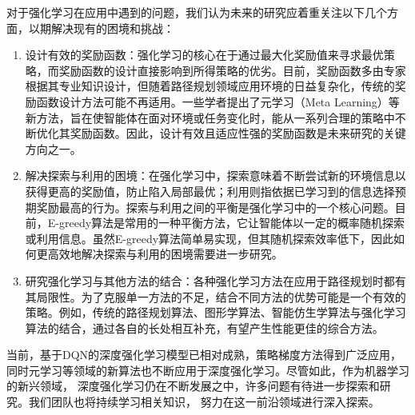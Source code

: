\documentclass{thuemp}
\begin{document}
对于强化学习在应用中遇到的问题，我们认为未来的研究应着重关注以下几个方面，以期解决现有的困境和挑战：
\begin{enumerate}
  \item 设计有效的奖励函数：强化学习的核心在于通过最大化奖励值来寻求最优策略，而奖励函数的设计直接影响到所得策略的优劣。目前，奖励函数多由专家根据其专业知识设计，但随着路径规划领域应用环境的日益复杂化，传统的奖励函数设计方法可能不再适用。一些学者提出了元学习（Meta Learning）等新方法，旨在使智能体在面对环境或任务变化时，能从一系列合理的策略中不断优化其奖励函数。因此，设计有效且适应性强的奖励函数是未来研究的关键方向之一。
  \item 解决探索与利用的困境：在强化学习中，探索意味着不断尝试新的环境信息以获得更高的奖励值，防止陷入局部最优；利用则指依据已学习到的信息选择预期奖励最高的行为。探索与利用之间的平衡是强化学习中的一个核心问题。目前，E-greedy算法是常用的一种平衡方法，它让智能体以一定的概率随机探索或利用信息。虽然E-greedy算法简单易实现，但其随机探索效率低下，因此如何更高效地解决探索与利用的困境需要进一步研究。
  \item 研究强化学习与其他方法的结合：各种强化学习方法在应用于路径规划时都有其局限性。为了克服单一方法的不足，结合不同方法的优势可能是一个有效的策略。例如，传统的路径规划算法、图形学算法、智能仿生学算法与强化学习算法的结合，通过各自的长处相互补充，有望产生性能更佳的综合方法。
\end{enumerate}

当前，基于DQN的深度强化学习模型已相对成熟，策略梯度方法得到广泛应用，
同时元学习等领域的新算法也不断应用于深度强化学习。尽管如此，作为机器学习的新兴领域，
深度强化学习仍在不断发展之中，许多问题有待进一步探索和研究。我们团队也将持续学习相关知识，
努力在这一前沿领域进行深入探索。



\renewcommand\refname{\heiti\wuhao\centerline{参考文献}\global\def\refname{参考文献}}
\vskip 12pt

\let\OLDthebibliography\thebibliography
\renewcommand\thebibliography[1]{
  \OLDthebibliography{#1}
  \setlength{\parskip}{0pt}
  \setlength{\itemsep}{0pt plus 0.3ex}
}

{
\renewcommand{\baselinestretch}{0.9}
\liuhao


}
\end{document}
